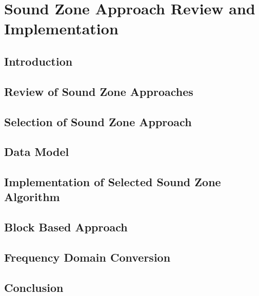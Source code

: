 \documentclass[10pt,twoside,openright,titlepage]{ce}
\begin{document}
\chapter{Sound Zone Approach Review and Implementation}
\label{ch:sound_zone}
\section{Introduction}
\label{ch:sound_zone:introduction}

\newpage
\section{Review of Sound Zone Approaches}
\label{ch:sound_zone:approach_review}

\newpage
\section{Selection of Sound Zone Approach}
\label{ch:sound_zone:approach_selection}

\newpage
\section{Data Model}
\label{ch:sound_zone:data_model}

\newpage
\section{Implementation of Selected Sound Zone Algorithm}
\label{ch:sound_zone:approach_implementation}

\newpage
\section{Block Based Approach}
\label{ch:sound_zone:block_based}

\newpage
\section{Frequency Domain Conversion}
\label{ch:sound_zone:frequency_domain_conversion}

\newpage
\section{Conclusion}
\label{ch:sound_zone:conclusion}

\end{document}

